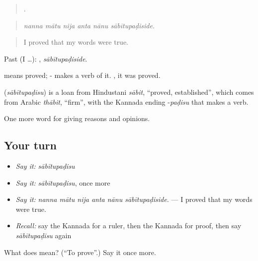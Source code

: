 \begin{quote}
     .
\end{quote}

\begin{quote}
\emph{nanna mātu nija anta nānu sābītupaḍiside.}
\end{quote}

\begin{quote}
I proved that my words were true.
\end{quote}

Past (I …): , \emph{sābītupaḍiside}.

 means proved; - makes a verb of it. , it was proved.

\begin{cousinweb}
\textbf{} (\emph{sābītupaḍisu}) is a loan from Hindustani \emph{sābit}, \textquotedblleft{}proved, established\textquotedblright{}, which comes from Arabic \emph{thābit}, \textquotedblleft{}firm\textquotedblright{}, with the Kannada ending -\emph{paḍisu} that makes a verb.
\end{cousinweb}

\begin{grammarlens}[title={What you've built}]
One more word for giving reasons and opinions.
\end{grammarlens}

\subsection*{Your turn}
\begin{itemize}
\raggedright
  \item \emph{Say it:} \emph{sābītupaḍisu}
  \item \emph{Say it:} \emph{sābītupaḍisu}, once more
  \item \emph{Say it:} \emph{nanna mātu nija anta nānu sābītupaḍiside.} — I proved that my words were true.
  \item \emph{Recall:} say the Kannada for a ruler, then the Kannada for proof, then say \emph{sābītupaḍisu} again
\end{itemize}

\begin{tcolorbox}[breakable,colback=teal!4,colframe=teal!35!black,title={Before you move on}]
What does  mean? (\textquotedblleft{}To prove\textquotedblright{}.) Say it once more.
\end{tcolorbox}
